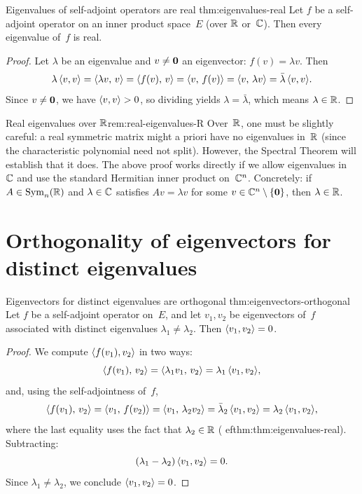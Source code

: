 \begin{theorem}{Eigenvalues of self-adjoint operators are real}%
{thm:eigenvalues-real}
Let $f$ be a self-adjoint operator on an inner product space~$E$
(over ${\mathbb{R}}$ or~${\mathbb{C}}$).  Then every eigenvalue of~$f$ is real.
\end{theorem}

\begin{proof}
Let $\lambda$ be an eigenvalue and $v\neq\mathbf{0}$ an eigenvector:
$f(v)=\lambda v$.  Then
\[
  \lambda\,\langle v,v\rangle
  = \langle\lambda v,\,v\rangle
  = \langle f(v),\,v\rangle
  = \langle v,\,f(v)\rangle
  = \langle v,\,\lambda v\rangle
  = \bar\lambda\,\langle v,v\rangle.
\]
Since $v\neq\mathbf{0}$, we have $\langle v,v\rangle>0$, so dividing yields
$\lambda = \bar\lambda$, which means $\lambda\in{\mathbb{R}}$.
\end{proof}

\begin{remark}{Real eigenvalues over ${\mathbb{R}}$}{rem:real-eigenvalues-R}
Over~${\mathbb{R}}$, one must be slightly careful: a real symmetric matrix might
a priori have no eigenvalues in~${\mathbb{R}}$ (since the characteristic polynomial
need not split).  However, the Spectral Theorem will establish that it
does.  The above proof works directly if we allow eigenvalues in~${\mathbb{C}}$
and use the standard Hermitian inner product on~${\mathbb{C}}^n$.  Concretely:
if $A\in\operatorname{Sym}_n({\mathbb{R}})$ and $\lambda\in{\mathbb{C}}$ satisfies $Av = \lambda v$ for
some $v\in{\mathbb{C}}^n\setminus\left\{\mathbf{0}\right\}$, then $\lambda\in{\mathbb{R}}$.
\end{remark}


\section{Orthogonality of eigenvectors for distinct eigenvalues}%
\label{sec:eigenvectors-orthogonal}

\begin{theorem}{Eigenvectors for distinct eigenvalues are orthogonal}%
{thm:eigenvectors-orthogonal}
Let $f$ be a self-adjoint operator on~$E$, and let $v_1,v_2$ be
eigenvectors of~$f$ associated with distinct eigenvalues
$\lambda_1\neq\lambda_2$.  Then $\langle v_1,v_2\rangle=0$.
\end{theorem}

\begin{proof}
We compute $\langle f(v_1),v_2\rangle$ in two ways:
\[
  \langle f(v_1),\,v_2\rangle
  = \langle\lambda_1 v_1,\,v_2\rangle
  = \lambda_1\,\langle v_1,v_2\rangle,
\]
and, using the self-adjointness of~$f$,
\[
  \langle f(v_1),\,v_2\rangle
  = \langle v_1,\,f(v_2)\rangle
  = \langle v_1,\,\lambda_2 v_2\rangle
  = \bar\lambda_2\,\langle v_1,v_2\rangle
  = \lambda_2\,\langle v_1,v_2\rangle,
\]
where the last equality uses the fact that $\lambda_2\in{\mathbb{R}}$
(
ef{thm:thm:eigenvalues-real}).  Subtracting:
\[
  (\lambda_1 - \lambda_2)\,\langle v_1,v_2\rangle = 0.
\]
Since $\lambda_1\neq\lambda_2$, we conclude $\langle v_1,v_2\rangle=0$.
\end{proof}

